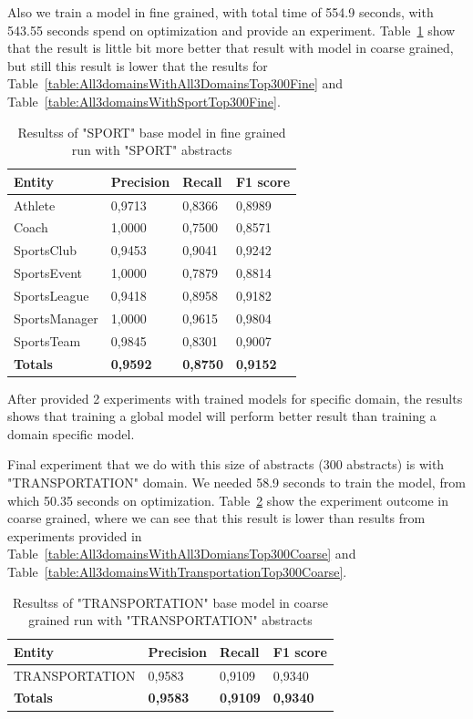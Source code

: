 \documentclass[thesis=M,english]{FITthesis}[2018/05/30]
\begin{document}
Also we train a model in fine grained, with total time of 554.9 seconds, with 543.55 seconds spend on optimization and provide an experiment. Table~\ref{table:SportdomainsWithSportTop300Fine} show that the result is little bit more better that result with model in coarse grained, but still this result is lower that the results for Table~\ref{table:All3domainsWithAll3DomainsTop300Fine} and Table~\ref{table:All3domainsWithSportTop300Fine}.
	\begin{table}[H]\centering
		\begin{tabular}{|l|l|l|l|}
			\hline {\textbf{Entity}} & {\textbf{Precision}} & {\textbf{Recall}} & {\textbf{F1 score}}\\\hline
				Athlete & 0,9713 & 0,8366 & 0,8989\\
				Coach & 1,0000 & 0,7500 & 0,8571\\
				SportsClub & 0,9453 & 0,9041 & 0,9242\\
				SportsEvent & 1,0000 & 0,7879 & 0,8814\\
				SportsLeague & 0,9418 & 0,8958 & 0,9182\\
				SportsManager & 1,0000 & 0,9615 & 0,9804\\				
				SportsTeam & 0,9845 & 0,8301 & 0,9007\\\hline
				\textbf{Totals} & \textbf{0,9592} & \textbf{0,8750} & \textbf{0,9152}\\\hline
		\end{tabular}
		\caption{Resultss of "SPORT" base model in fine grained run with "SPORT" abstracts \label{table:SportdomainsWithSportTop300Fine}}
	\end{table}
	
	After provided 2 experiments with trained models for specific domain, the results shows that training a global model will perform better result than training a domain specific model.	

Final experiment that we do with this size of abstracts (300 abstracts) is with "TRANSPORTATION" domain. We needed 58.9 seconds to train the model, from which 50.35 seconds on optimization.
  Table~\ref{table:TransportationDomainsWithTransportationTop300Coarse} show the experiment outcome in coarse grained, where we can see that this result is lower than results from experiments provided in Table~\ref{table:All3domainsWithAll3DomiansTop300Coarse} and Table~\ref{table:All3domainsWithTransportationTop300Coarse}.  
	\begin{table}[H]\centering
		\begin{tabular}{|l|l|l|l|}
			\hline {\textbf{Entity}} & {\textbf{Precision}} & {\textbf{Recall}} & {\textbf{F1 score}}\\\hline
				TRANSPORTATION & 0,9583 & 0,9109 & 0,9340\\\hline
				\textbf{Totals} & \textbf{0,9583} & \textbf{0,9109} & \textbf{0,9340}\\\hline
		\end{tabular}
		\caption{Resultss of "TRANSPORTATION" base model in coarse grained run with "TRANSPORTATION" abstracts \label{table:TransportationDomainsWithTransportationTop300Coarse}}
	\end{table}
	
\end{document}
